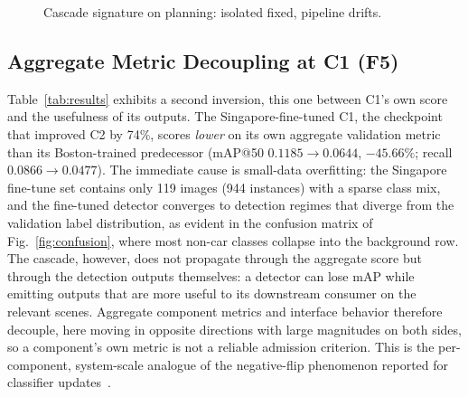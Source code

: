 \documentclass[conference]{IEEEtran}
\begin{document}
\begin{figure}[htbp]
\centering
{}
\caption{Cascade signature on planning: isolated fixed, pipeline drifts.}
\label{fig:cascade}
\end{figure}

\subsection{Aggregate Metric Decoupling at C1 (F5)}
\label{sec:res-decouple}
Table~\ref{tab:results} exhibits a second inversion, this one between C1's own
score and the usefulness of its outputs. The Singapore-fine-tuned C1, the
checkpoint that improved C2 by 74\%, scores \emph{lower} on its own aggregate
validation metric than its Boston-trained predecessor (mAP@50 $0.1185 \to
0.0644$, $-45.66\%$; recall $0.0866 \to 0.0477$). The immediate cause is
small-data overfitting: the Singapore fine-tune set contains only 119 images
(944 instances) with a sparse class mix, and the fine-tuned detector converges
to detection regimes that diverge from the validation label distribution, as
evident in the confusion matrix of Fig.~\ref{fig:confusion}, where most non-car
classes collapse into the background row. The cascade, however, does not
propagate through the aggregate score but through the detection outputs
themselves: a detector can lose mAP while emitting outputs that are more useful
to its downstream consumer on the relevant scenes. Aggregate component metrics
and interface behavior therefore decouple, here moving in opposite directions
with large magnitudes on both sides, so a component's own metric is not a
reliable admission criterion. This is the per-component, system-scale analogue
of the negative-flip phenomenon reported for classifier
updates~\cite{yan2021pctraining}.
\end{document}
